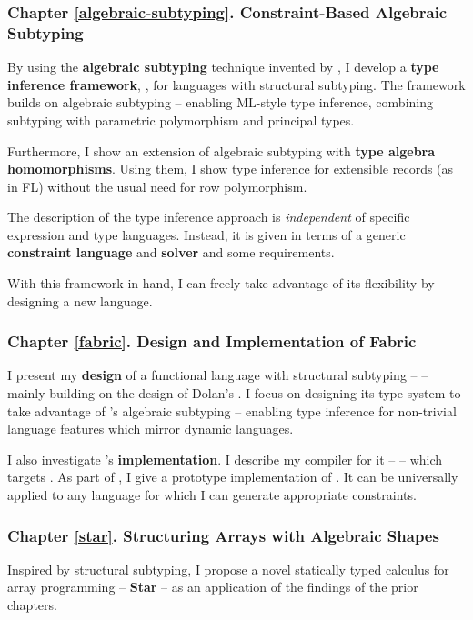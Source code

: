 \subsubsection{Chapter \ref{algebraic-subtyping}. Constraint-Based Algebraic Subtyping}

By using the \textbf{algebraic subtyping} technique invented by \textcite{dolan-thesis}, I develop a \textbf{type inference framework}, \inference{}, for languages with structural subtyping. 
The framework builds on algebraic subtyping -- enabling ML-style type inference, combining subtyping with parametric polymorphism and principal types. 

Furthermore, I show an extension of algebraic subtyping with \textbf{type algebra homomorphisms}. Using them, I show type inference for extensible records (as in FL) without the usual need for row polymorphism.

The description of the type inference approach is \emph{independent} of specific expression and type languages. Instead, it is given in terms of a generic \textbf{constraint language} and \textbf{solver} and some requirements. 

With this framework in hand, I can freely take advantage of its flexibility by designing a new language.

\subsubsection{Chapter \ref{fabric}. Design and Implementation of Fabric}
I present my \textbf{design} of a functional language with structural subtyping -- \textbf{\fabric{}} -- mainly building on the design of Dolan's \mlsub{}. I focus on designing its type system to take advantage of \inference{}'s algebraic subtyping -- enabling type inference for non-trivial language features which mirror dynamic languages.

I also investigate \fabric{}'s \textbf{implementation}. I describe my compiler for it -- \compiler{} -- which targets \wasm{}. 
As part of \compiler{}, I give a prototype implementation of \inference{}. It can be universally applied to any language for which I can generate appropriate constraints.

\subsubsection{Chapter \ref{star}. Structuring Arrays with Algebraic Shapes}
Inspired by structural subtyping, I propose a novel statically typed calculus for array  programming -- \textbf{Star} -- as an application of the findings of the prior chapters. 

